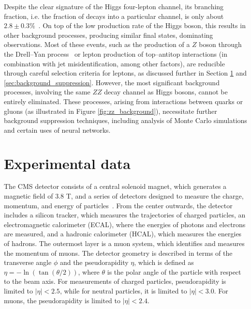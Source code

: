 \documentclass[aps,twocolumn,secnumarabic,balancelastpage,amsmath,amssymb,nofootinbib,floatfix]{revtex4-1}
\begin{document}
Despite the clear signature of the Higgs four-lepton channel, its branching fraction, i.e. the fraction of decays into a particular channel, is only about $2.8 \pm 0.3 \%$~\citep{PDG2024}. On top of the low production rate of the Higgs boson, this results in other background processes, producing similar final states, dominating observations. Most of these events, such as the production of a $Z$ boson through the Drell–Yan process~\citep{DrellYan1970} or lepton production of top–antitop interactions (in combination with jet misidentification, among other factors), are reducible through careful selection criteria for leptons, as discussed further in Section \ref{sec:experiment} and \ref{sec:background_suppression}. However, the most significant background processes, involving the same $ZZ$ decay channel as Higgs bosons, cannot be entirely eliminated. These processes, arising from interactions between quarks or gluons (as illustrated in Figure \ref{fig:zz_background}), necessitate further background suppression techniques, including analysis of Monte Carlo simulations and certain uses of neural networks.


\section{Experimental data}
\label{sec:experiment}

The CMS detector consists of a central solenoid magnet, which generates a magnetic field of 3.8 T, and a series of detectors designed to measure the charge, momentum, and energy of particles~\citep{CMS2008}. From the center outwards, the detector includes a silicon tracker, which measures the trajectories of charged particles, an electromagnetic calorimeter (ECAL), where the energies of photons and electrons are measured, and a hadronic calorimeter (HCAL), which measures the energies of hadrons. The outermost layer is a muon system, which identifies and measures the momentum of muons. The detector geometry is described in terms of the transverse angle $\phi$ and the pseudorapidity $\eta$, which is defined as $\eta = -\ln(\tan(\theta/2))$, where $\theta$ is the polar angle of the particle with respect to the beam axis. For measurements of charged particles, pseudorapidity is limited to $|\eta| < 2.5$, while for neutral particles, it is limited to $|\eta| < 3.0$. For muons, the pseudorapidity is limited to $|\eta| < 2.4$.
\end{document}
